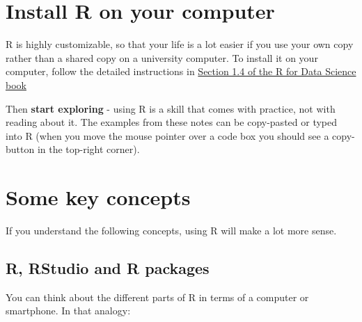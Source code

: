 \documentclass[
]{book}
\begin{document}
\hypertarget{install-r-on-your-computer}{%
\section{Install R on your computer}\label{install-r-on-your-computer}}

R is highly customizable, so that your life is a lot easier if you use your own copy rather than a shared copy on a university computer. To install it on your computer, follow the detailed instructions in \href{https://r4ds.had.co.nz/introduction.html}{Section 1.4 of the R for Data Science book}

Then \textbf{start exploring} - using R is a skill that comes with practice, not with reading about it. The examples from these notes can be copy-pasted or typed into R (when you move the mouse pointer over a code box you should see a copy-button in the top-right corner).

\hypertarget{some-key-concepts}{%
\section{Some key concepts}\label{some-key-concepts}}

If you understand the following concepts, using R will make a lot more sense.

\hypertarget{r-rstudio-and-r-packages}{%
\subsection{R, RStudio and R packages}\label{r-rstudio-and-r-packages}}

You can think about the different parts of R in terms of a computer or smartphone. In that analogy:
\end{document}

